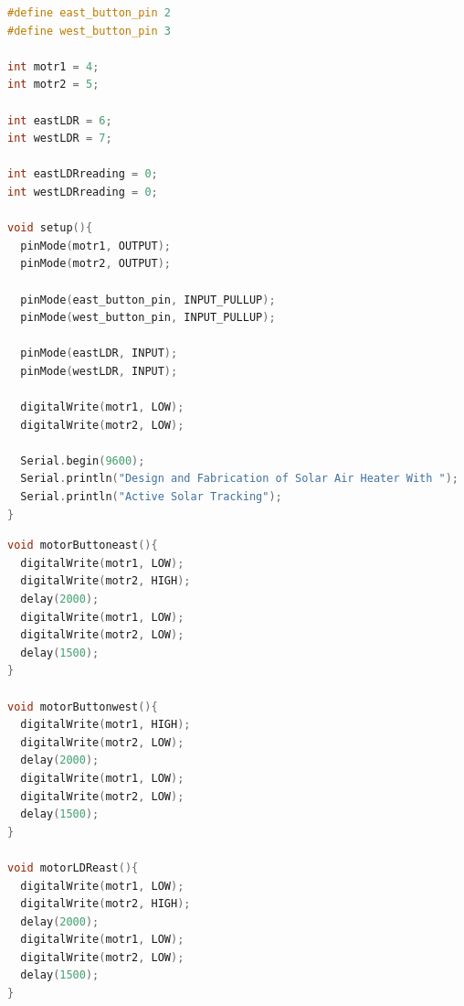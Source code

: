 \documentclass[12pt,a4paper]{article}
\begin{document}
\begin{lstlisting}[language=C++]
#define east_button_pin 2 
#define west_button_pin 3

int motr1 = 4; 
int motr2 = 5;

int eastLDR = 6; 
int westLDR = 7;

int eastLDRreading = 0; 
int westLDRreading = 0;

void setup(){ 
  pinMode(motr1, OUTPUT); 
  pinMode(motr2, OUTPUT);

  pinMode(east_button_pin, INPUT_PULLUP); 
  pinMode(west_button_pin, INPUT_PULLUP);

  pinMode(eastLDR, INPUT); 
  pinMode(westLDR, INPUT);

  digitalWrite(motr1, LOW); 
  digitalWrite(motr2, LOW);

  Serial.begin(9600);
  Serial.println("Design and Fabrication of Solar Air Heater With "); 
  Serial.println("Active Solar Tracking");
}
\end{lstlisting}
\clearpage




\begin{lstlisting}[language=C++]
void motorButtoneast(){
  digitalWrite(motr1, LOW); 
  digitalWrite(motr2, HIGH); 
  delay(2000); 
  digitalWrite(motr1, LOW); 
  digitalWrite(motr2, LOW); 
  delay(1500);
}

void motorButtonwest(){
  digitalWrite(motr1, HIGH); 
  digitalWrite(motr2, LOW); 
  delay(2000); 
  digitalWrite(motr1, LOW); 
  digitalWrite(motr2, LOW); 
  delay(1500);
}

void motorLDReast(){
  digitalWrite(motr1, LOW); 
  digitalWrite(motr2, HIGH); 
  delay(2000); 
  digitalWrite(motr1, LOW); 
  digitalWrite(motr2, LOW); 
  delay(1500);
}
\end{lstlisting}
\clearpage



\end{document}
